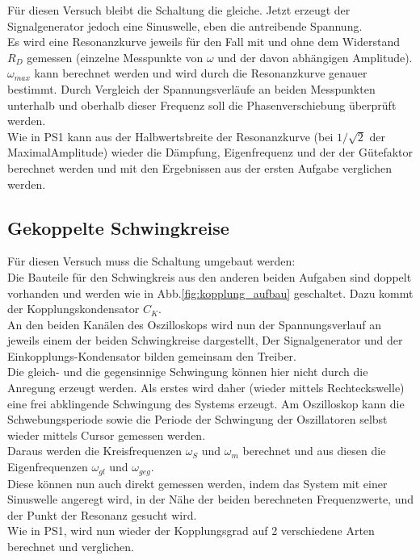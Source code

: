 \documentclass[12pt,a4paper]{article}
\begin{document}
\begin{multicols}{2}
Für diesen Versuch bleibt die Schaltung die gleiche. Jetzt erzeugt der Signalgenerator jedoch eine Sinuswelle, eben die antreibende Spannung.\\
Es wird eine Resonanzkurve jeweils für den Fall mit und ohne dem Widerstand $R_D$ gemessen (einzelne Messpunkte von $\omega$ und der davon abhängigen Amplitude).\\
$\omega_{max}$ kann berechnet werden und wird durch die Resonanzkurve genauer bestimmt. Durch Vergleich der Spannungsverläufe an beiden Messpunkten unterhalb und oberhalb dieser Frequenz soll die Phasenverschiebung überprüft werden.\\
Wie in PS1 kann aus der Halbwertsbreite der Resonanzkurve (bei $1/\sqrt{2}$ der MaximalAmplitude) wieder die Dämpfung, Eigenfrequenz und der der Gütefaktor berechnet werden und mit den Ergebnissen aus der ersten Aufgabe verglichen werden.


\subsection{Gekoppelte Schwingkreise}

Für diesen Versuch muss die Schaltung umgebaut werden:\\
Die Bauteile für den Schwingkreis aus den anderen beiden Aufgaben sind doppelt vorhanden und werden wie in Abb.\ref{fig:kopplung_aufbau} geschaltet. Dazu kommt der Kopplungskondensator $C_K$.\\
An den beiden Kanälen des Oszilloskops wird nun der Spannungsverlauf an jeweils einem der beiden Schwingkreise dargestellt, Der Signalgenerator und der Einkopplungs-Kondensator bilden gemeinsam den Treiber.\\

Die gleich- und die gegensinnige Schwingung können hier nicht durch die Anregung erzeugt werden. Als erstes wird daher (wieder mittels Rechteckswelle) eine frei abklingende Schwingung des Systems erzeugt. Am Oszilloskop kann die Schwebungsperiode sowie die Periode der Schwingung der Oszillatoren selbst wieder mittels Cursor gemessen werden.\\
Daraus werden die Kreisfrequenzen $\omega_S$ und $\omega_m$ berechnet und aus diesen die Eigenfrequenzen $\omega_{gl}$ und $\omega_{geg}$.\\
Diese können nun auch direkt gemessen werden, indem das System mit einer Sinuswelle angeregt wird, in der Nähe der beiden berechneten Frequenzwerte, und der Punkt der Resonanz gesucht wird.\\
Wie in PS1, wird nun wieder der Kopplungsgrad auf 2 verschiedene Arten berechnet und verglichen.


\end{multicols}
\end{document}
